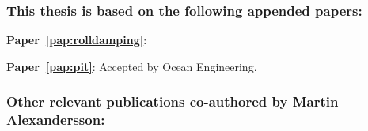 

\subsubsection*{\normalfont \color{black} \textbf{This thesis is based on the following appended papers:}}

\noindent\begin{minipage}[adjusting]{\linewidth}
\textbf{Paper~\ref{pap:rolldamping}}: 
\end{minipage}
\vspace{0.25cm}
\newline
\noindent\begin{minipage}[adjusting]{\linewidth}
\textbf{Paper~\ref{pap:pit}}: 
Accepted by Ocean Engineering.
\end{minipage}
\clearpage
\subsubsection*{\normalfont \color{black} \textbf{Other relevant publications co-authored by Martin Alexandersson:}} 
\normalsize
\newcommand{\ME}{{\bfseries Martin Alexandersson}}

\noindent\begin{minipage}[adjusting]{\linewidth}
\end{minipage}
\vspace{0.25cm}
\newline
\noindent\begin{minipage}[adjusting]{\linewidth}

\end{minipage}


